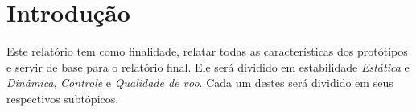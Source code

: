 \section{Introdução}
Este relatório tem como finalidade, relatar todas as características dos
protótipos e servir de base para o relatório final. Ele será dividido em 
estabilidade \textit{Estática} e \textit{Dinâmica}, \textit{Controle} e 
\textit{Qualidade de voo}. Cada um destes será dividido em seus respectivos
subtópicos. 